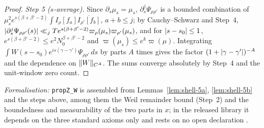 \begin{proof}
\emph{Step 5 ($s$-average).} Since $\partial_s\mu_s=\mu_s$, $\partial^j_s\Psi_{\rho\rho'}$ is a bounded combination of
$\mu_s^2e^{s(\beta+\beta'-2)}\int I_\rho[f_a]\overline{I_{\rho'}[f_b]}$, $a+b\le j$; by Cauchy--Schwarz and Step~4,
$\lvert \partial^j_s\Psi_{\rho\rho'}(s)\rvert\ll_jTe^{s(\beta+\beta'-2)}\varpi_\rho(\mu_s)\varpi_{\rho'}(\mu_s)$, and for $\lvert s-s_0\rvert\le1$,
$e^{s(\beta+\beta'-2)}\le e^2N_0^{\beta+\beta'-2}$ and $\varpi(\mu_s)\le e^k\varpi(\mu)$. Integrating $\int W(s-s_0)e^{is(\gamma-\gamma')}\Psi_{\rho\rho'}\,ds$ by parts $A$
times gives the factor $(1+\lvert \gamma-\gamma'\rvert)^{-A}$ and the dependence on $\lVert W\rVert_{C^A}$. The sums converge absolutely by Step~4 and the unit-window
zero count.
\end{proof}

\emph{Formalisation:} \texttt{propZ\_W} is assembled from Lemmas~\ref{lem:shell-5a}, \ref{lem:shell-5b} and the steps above, among them the Weil
remainder bound (Step~2) and the boundedness and measurability of the two parts in $x$; in the released library it depends on the three standard
axioms only and rests on no open declaration \tagL.

